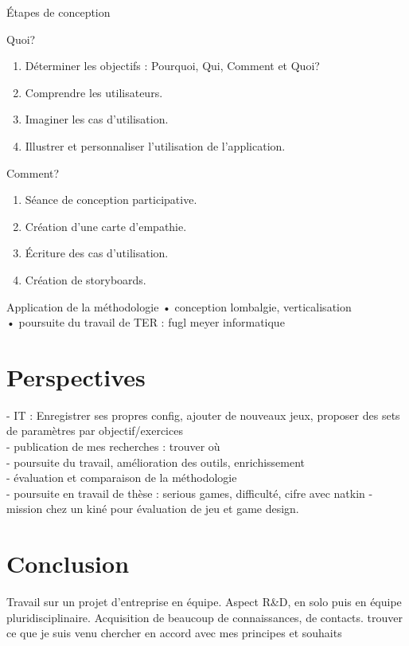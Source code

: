 \documentclass{beamer}
\begin{document}
		\begin{frame}{Étapes de conception}
			\begin{block}{Quoi?}
				\begin{enumerate}
					\item<1> Déterminer les objectifs : Pourquoi, Qui, Comment et Quoi? 
					\item<2> Comprendre les utilisateurs.
					\item<3> Imaginer les cas d'utilisation.
					\item<4> Illustrer et personnaliser l'utilisation de l'application.
				\end{enumerate}
			\end{block}
			\begin{block}{Comment?}
				\begin{enumerate}
					\item<1> Séance de conception participative.
					\item<2> Création d'une carte d'empathie.
					\item<3> Écriture des cas d'utilisation.
					\item<4> Création de storyboards.
				\end{enumerate}
			\end{block}
		\end{frame}
		
		\begin{frame}{Application de la méthodologie}
			• conception lombalgie, verticalisation\\
			• poursuite du travail de TER : fugl meyer informatique
		\end{frame}
	
	\section{Perspectives}
		\begin{frame}
		 	- IT : Enregistrer ses propres config, ajouter de nouveaux jeux, proposer des sets de paramètres par objectif/exercices\\
			- publication de mes recherches : trouver où\\
			- poursuite du travail, amélioration des outils, enrichissement\\
			- évaluation et comparaison de la méthodologie\\
			- poursuite en travail de thèse : serious games, difficulté, cifre avec natkin
			- mission chez un kiné pour évaluation de jeu et game design.
		\end{frame}
	
	\section{Conclusion}
		\begin{frame}
			Travail sur un projet d'entreprise en équipe.
			Aspect R\&D, en solo puis en équipe pluridisciplinaire.
			Acquisition de beaucoup de connaissances, de contacts.
			trouver ce que je suis venu chercher en accord avec mes principes et souhaits
		\end{frame}
\end{document}
